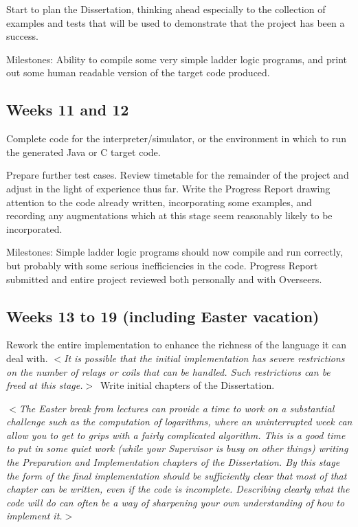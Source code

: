\documentclass[12pt]{article}
\newcommand{\al}{$<$}
\newcommand{\ar}{$>$}
\begin{document}
Start to plan the Dissertation, thinking ahead especially to the
collection of examples and tests that will be used to demonstrate that
the project has been a success.

Milestones: Ability to compile some very simple ladder logic programs,
and print out some human readable version of the target code produced.


\subsection*{Weeks 11 and 12}

Complete code for the interpreter/simulator, or the environment in
which to run the generated Java or C target code.

Prepare further test cases.  Review timetable for the remainder of the
project and adjust in the light of experience thus far.  Write the
Progress Report drawing attention to the code already written,
incorporating some examples, and recording any augmentations which at
this stage seem reasonably likely to be incorporated.

Milestones: Simple ladder logic programs should now compile and run
correctly, but probably with some serious inefficiencies in the code.
Progress Report submitted and entire project reviewed both personally
and with Overseers.


\subsection*{Weeks 13 to 19 (including Easter vacation)}

Rework the entire implementation to enhance the
richness of the language it can deal with. \al\emph{It is possible that
the initial implementation has severe restrictions on the number of
relays or coils that can be handled. Such restrictions can be freed at
this stage.}\ar\  Write initial chapters of the Dissertation.

\al\emph{The Easter break from lectures can provide a time to work on a
substantial challenge such as the computation of logarithms, where an
uninterrupted week can allow you to get to grips with a fairly
complicated algorithm.  This is a good time to put in some quiet work
(while your Supervisor is busy on other things) writing the
Preparation and Implementation chapters of the Dissertation.  By this
stage the form of the final implementation should be sufficiently
clear that most of that chapter can be written, even if the code is
incomplete.  Describing clearly what the code will do can often be a
way of sharpening your own understanding of how to implement it.}\ar
\end{document}
